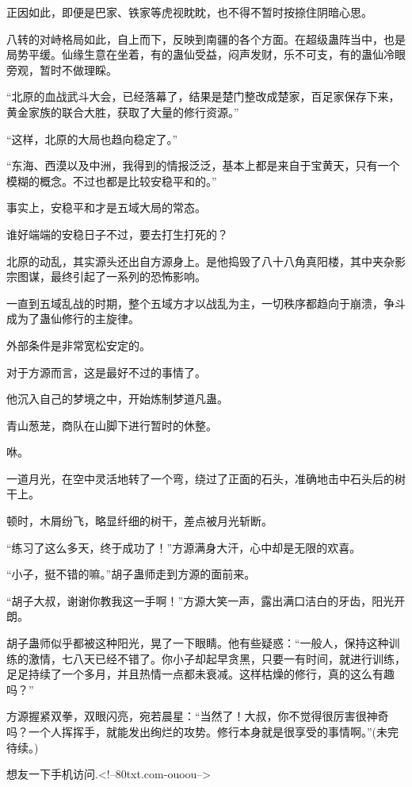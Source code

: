 \begin{this_body}
正因如此，即便是巴家、铁家等虎视眈眈，也不得不暂时按捺住阴暗心思。

八转的对峙格局如此，自上而下，反映到南疆的各个方面。在超级蛊阵当中，也是局势平缓。仙缘生意在坐着，有的蛊仙受益，闷声发财，乐不可支，有的蛊仙冷眼旁观，暂时不做理睬。

“北原的血战武斗大会，已经落幕了，结果是楚门整改成楚家，百足家保存下来，黄金家族的联合大胜，获取了大量的修行资源。”

“这样，北原的大局也趋向稳定了。”

“东海、西漠以及中洲，我得到的情报泛泛，基本上都是来自于宝黄天，只有一个模糊的概念。不过也都是比较安稳平和的。”

事实上，安稳平和才是五域大局的常态。

谁好端端的安稳日子不过，要去打生打死的？

北原的动乱，其实源头还出自方源身上。是他捣毁了八十八角真阳楼，其中夹杂影宗图谋，最终引起了一系列的恐怖影响。

一直到五域乱战的时期，整个五域方才以战乱为主，一切秩序都趋向于崩溃，争斗成为了蛊仙修行的主旋律。

外部条件是非常宽松安定的。

对于方源而言，这是最好不过的事情了。

他沉入自己的梦境之中，开始炼制梦道凡蛊。

青山葱茏，商队在山脚下进行暂时的休整。

咻。

一道月光，在空中灵活地转了一个弯，绕过了正面的石头，准确地击中石头后的树干上。

顿时，木屑纷飞，略显纤细的树干，差点被月光斩断。

“练习了这么多天，终于成功了！”方源满身大汗，心中却是无限的欢喜。

“小子，挺不错的嘛。”胡子蛊师走到方源的面前来。

“胡子大叔，谢谢你教我这一手啊！”方源大笑一声，露出满口洁白的牙齿，阳光开朗。

胡子蛊师似乎都被这种阳光，晃了一下眼睛。他有些疑惑：“一般人，保持这种训练的激情，七八天已经不错了。你小子却起早贪黑，只要一有时间，就进行训练，足足持续了一个多月，并且热情一点都未衰减。这样枯燥的修行，真的这么有趣吗？”

方源握紧双拳，双眼闪亮，宛若晨星：“当然了！大叔，你不觉得很厉害很神奇吗？一个人挥挥手，就能发出绚烂的攻势。修行本身就是很享受的事情啊。”(未完待续。)

想友一下手机访问.<!--80txt.com-ouoou-->

\end{this_body}

